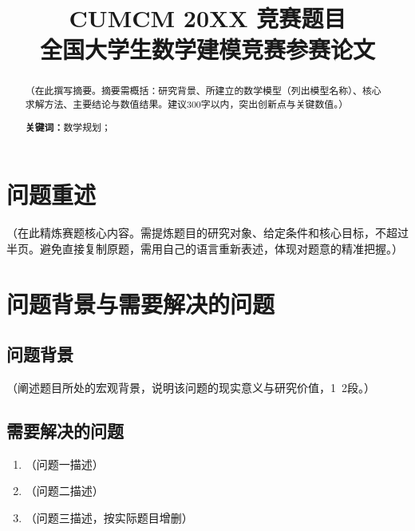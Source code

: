 \documentclass[12pt, a4paper]{article}
\title{
    \vspace{-1cm}
    {\Large \textbf{CUMCM 20XX 竞赛题目}} \\[0.5em]
    {\large 全国大学生数学建模竞赛参赛论文}
}
\author{}
\date{}
\begin{document}
\maketitle
\thispagestyle{empty}

\begin{abstract}
\noindent
（在此撰写摘要。摘要需概括：研究背景、所建立的数学模型（列出模型名称）、核心求解方法、主要结论与数值结果。建议300字以内，突出创新点与关键数值。）

\vspace{1em}
\noindent\textbf{关键词：}数学规划；%
\end{abstract}

\newpage
\tableofcontents
\newpage

\section{问题重述}

（在此精炼赛题核心内容。需提炼题目的研究对象、给定条件和核心目标，不超过半页。避免直接复制原题，需用自己的语言重新表述，体现对题意的精准把握。）

\section{问题背景与需要解决的问题}

\subsection{问题背景}

（阐述题目所处的宏观背景，说明该问题的现实意义与研究价值，1~2段。）

\subsection{需要解决的问题}

\begin{enumerate}[label=\textbf{问题\arabic*：}, leftmargin=*]
    \item （问题一描述）
    \item （问题二描述）
    \item （问题三描述，按实际题目增删）
\end{enumerate}

\end{document}
